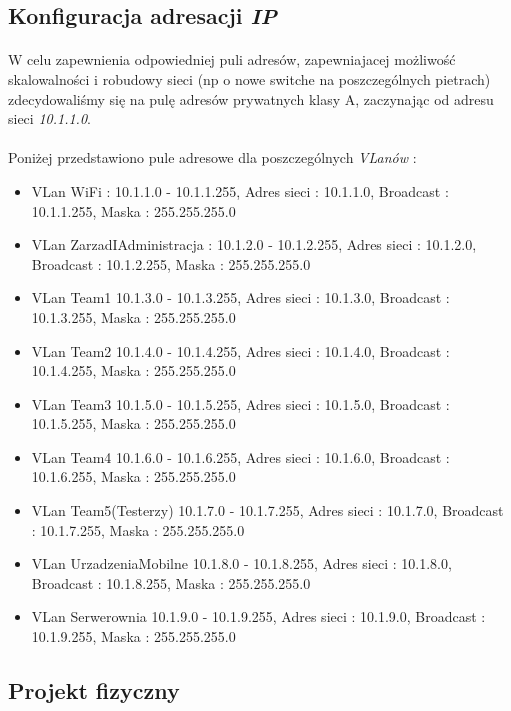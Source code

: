 \subsection{Konfiguracja adresacji \textit{IP}}
\paragraph{}
W celu zapewnienia odpowiedniej puli adresów, zapewniajacej możliwość skalowalności i robudowy sieci (np o nowe switche na poszczególnych pietrach) zdecydowaliśmy się na pulę adresów prywatnych klasy A, zaczynając od adresu sieci \textit{10.1.1.0}.
\paragraph{}
Poniżej przedstawiono pule adresowe dla poszczególnych \textit{VLanów} :
\begin{itemize}
	\item VLan WiFi : 10.1.1.0 - 10.1.1.255, Adres sieci : 10.1.1.0, Broadcast : 10.1.1.255, Maska : 255.255.255.0
	\item VLan ZarzadIAdministracja : 10.1.2.0 - 10.1.2.255, Adres sieci : 10.1.2.0, Broadcast : 10.1.2.255, Maska : 255.255.255.0
	\item VLan Team1 10.1.3.0 - 10.1.3.255, Adres sieci : 10.1.3.0, Broadcast : 10.1.3.255, Maska : 255.255.255.0 
	\item VLan Team2 10.1.4.0 - 10.1.4.255, Adres sieci : 10.1.4.0, Broadcast : 10.1.4.255, Maska : 255.255.255.0 
	\item VLan Team3 10.1.5.0 - 10.1.5.255, Adres sieci : 10.1.5.0, Broadcast : 10.1.5.255, Maska : 255.255.255.0
	\item VLan Team4 10.1.6.0 - 10.1.6.255, Adres sieci : 10.1.6.0, Broadcast : 10.1.6.255, Maska : 255.255.255.0  
	\item VLan Team5(Testerzy) 10.1.7.0 - 10.1.7.255, Adres sieci : 10.1.7.0, Broadcast : 10.1.7.255, Maska : 255.255.255.0 
	\item VLan UrzadzeniaMobilne 10.1.8.0 - 10.1.8.255, Adres sieci : 10.1.8.0, Broadcast : 10.1.8.255, Maska : 255.255.255.0
	\item VLan Serwerownia 10.1.9.0 - 10.1.9.255, Adres sieci : 10.1.9.0, Broadcast : 10.1.9.255, Maska : 255.255.255.0  
\end{itemize}


\subsection{Projekt fizyczny}
